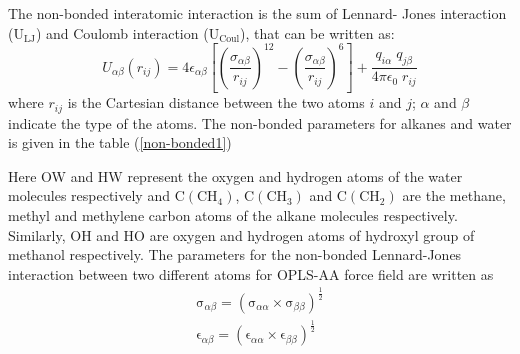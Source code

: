  The non-bonded interatomic interaction is the sum of Lennard- Jones interaction ($\mathrm {U_ {LJ}}$)  and Coulomb interaction ($\mathrm {U_ {Coul}}$), that can be written as:
\begin{equation}
U_{\alpha\beta}(r_{ij}) = 4\epsilon_{\alpha \beta}\left[\left(\frac{\sigma_{\alpha\beta}}{r_{ij}}\right)^{12} - \left(\frac{\sigma_{\alpha\beta}}{r_{ij}}\right)^6\right] +  \frac{q_{i\alpha}\;q_{j\beta}}{4\pi\epsilon_0\;r_{ij}}
\end{equation}
 where $r_{ij}$ is the Cartesian distance between the two
atoms $i$ and $j$; $\alpha$ and $\beta$  indicate the type of the
atoms. The non-bonded parameters for alkanes  and water  is given in the table (\ref{non-bonded1})
\begin{table}[H]
\centering
\caption[Force-field (non-bonded) parameters for TIP3P water  and OPLS-AA alkanes and  methanol.]
{Force-field (non-bonded) parameters for TIP3P water  and OPLS-AA alkanes and  methanol.}
\label{non-bonded1}
\end{table}
 Here OW and HW represent the oxygen and hydrogen atoms of the water molecules respectively and $ \mathrm{C(CH_4)}$, $ \mathrm{C(CH_3)}$ and  $ \mathrm{C(CH_2)}$ are the methane, methyl and methylene carbon atoms of the alkane  molecules respectively. Similarly, $ \mathrm{OH}$ and  $ \mathrm{HO}$ are  oxygen and hydrogen atoms of hydroxyl group of methanol respectively. The parameters for the non-bonded Lennard-Jones interaction between two different atoms for OPLS-AA force field  are written as~ \citep{Gromacs-manual}
\begin{eqnarray} 
\mathrm{\sigma}_{\alpha\beta} =  \left(\mathrm{\sigma}_{\alpha\alpha} \times \mathrm{\sigma}_{\beta\beta} \right)^{\frac{1}{2}}\\
\mathrm{\epsilon}_{\alpha\beta} = \left(\mathrm{\epsilon}_{\alpha\alpha} \times \mathrm{\epsilon}_{\beta\beta} \right)^{\frac{1}{2}} 
\end{eqnarray}

